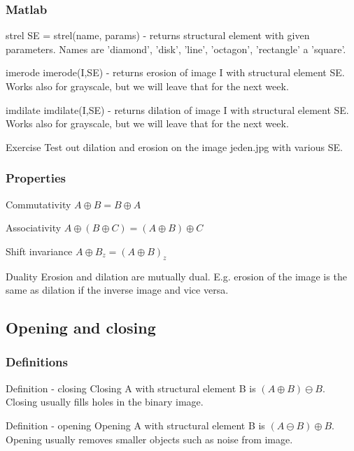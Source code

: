 \documentclass{beamer}
\begin{document}
\begin{frame}
\frametitle{Matlab} 
  \begin{block}{strel}  
  SE = strel(name, params) - returns structural element with given parameters. Names are 'diamond', 'disk', 'line', 'octagon', 'rectangle' a 'square'.
  \end{block}
    
  \begin{block}{imerode}
  imerode(I,SE) - returns erosion of image I with structural element SE. Works also for grayscale, but we will leave that for the next week.
  \end{block}
  
    \begin{block}{imdilate}
  imdilate(I,SE) - returns dilation of image I with structural element SE. Works also for grayscale, but we will leave that for the next week.
  \end{block}
  
  \begin{block}{Exercise}
  Test out dilation and erosion on the image jeden.jpg with various SE.
  \end{block}
\end{frame}

\begin{frame}
\frametitle{Properties}
  \begin{block}{Commutativity}
  $A \oplus B = B \oplus A$ 
  \end{block}
    
  \begin{block}{Associativity}
  $A \oplus (B \oplus C) = (A \oplus B) \oplus C$ 
  \end{block}
  
  \begin{block}{Shift invariance}
  $A \oplus B_z = (A \oplus B)_z$
  \end{block}
  
  \begin{block}{Duality}
  Erosion and dilation are mutually dual. E.g. erosion of the image is the same as dilation if the inverse image and vice versa.
  \end{block}
\end{frame}


\subsection{Opening and closing}

\begin{frame}
\frametitle{Definitions}
  \begin{block}{Definition - closing}
  Closing A with structural element B is  $(A \oplus B) \ominus B$. Closing usually fills holes in the binary image.
  \end{block}
  
  \begin{block}{Definition - opening}
  Opening A with structural element B is $(A \ominus B) \oplus B$. Opening usually removes smaller objects such as noise from image.
  \end{block}
\end{frame}
\end{document}

